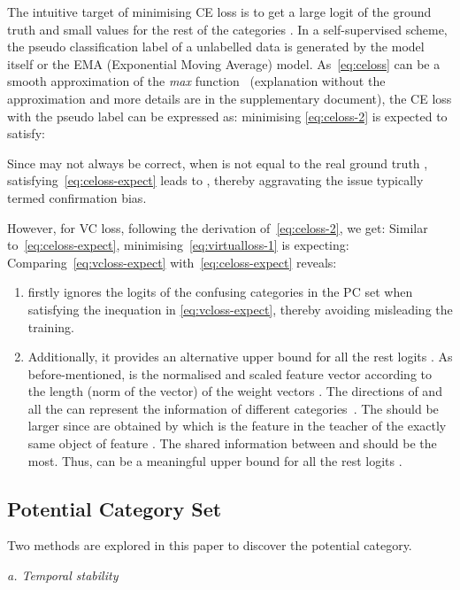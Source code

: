 \documentclass[runningheads]{llncs}
\begin{document}
The intuitive target of minimising CE loss is to get a large logit  of the ground truth and small values for the rest of the categories . In a self-supervised scheme, the pseudo classification label  of a unlabelled data  is generated by the model itself or the EMA (Exponential Moving Average) model. As~\cref{eq:celoss} can be a smooth approximation of the \textit{max} function~\cite{boyd2004convex} (explanation without the approximation and more details are in the supplementary document), the CE loss with the pseudo label  can be expressed as:
 minimising \cref{eq:celoss-2} is expected to satisfy:


\noindent Since  may not always be correct, when  is not equal to the real ground truth , satisfying~\cref{eq:celoss-expect} leads to , thereby aggravating the issue typically termed confirmation bias.

However, for VC loss, following the derivation of~\cref{eq:celoss-2}, we get:
 Similar to~\cref{eq:celoss-expect}, minimising~\cref{eq:virtualloss-1} is expecting:
 Comparing~\cref{eq:vcloss-expect} with~\cref{eq:celoss-expect} reveals:

\begin{enumerate}
	\item  firstly ignores the logits  of the confusing categories in the PC set when satisfying the inequation in \cref{eq:vcloss-expect}, thereby avoiding misleading the training.
	\item Additionally, it provides an alternative upper bound  for all the rest logits . As before-mentioned,  is the normalised and scaled feature vector  according to the length (norm of the vector) of the weight vectors . The directions of  and all the  can represent the information of different categories~\cite{Hang_2018_Low}. The  should be larger since  are obtained by  which is the feature in the teacher of the exactly same object of feature . The shared information between  and  should be the most. Thus,  can be a meaningful upper bound for all the rest logits .
\end{enumerate}

\subsection{Potential Category Set}
\label{sec:pcset}
Two methods are explored in this paper to discover the potential category.

\vspace{0.5em}\noindent\textit{a. Temporal stability}
\end{document}
